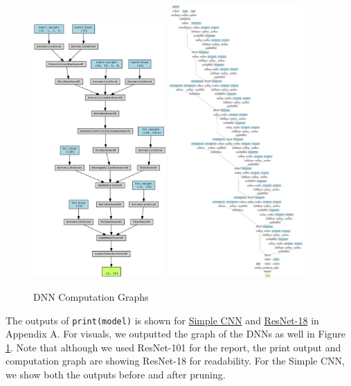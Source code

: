 \documentclass{article}
\begin{document}
\begin{figure}
	\centerline{
		\includegraphics[width=2in]{../proj1/figures/mnist_cnn.png}
		\includegraphics[width=2in]{../proj1/figures/resnet18.png}
	}
	\caption{DNN Computation Graphs}
	\label{fig:dnngraph}
\end{figure}

The outputs of \verb|print(model)| is shown for \hyperref[sec:A1]{Simple CNN} and \hyperref[sec:A2]{ResNet-18} in Appendix A. For visuals, we outputted the graph of the DNNs as well in Figure \ref{fig:dnngraph}. Note that although we used ResNet-101 for the report, the print output and computation graph are showing ResNet-18 for readability. For the Simple CNN, we show both the outputs before and after pruning.
\end{document}
